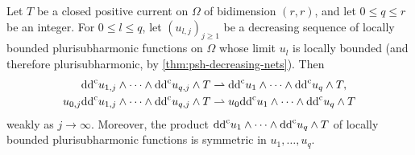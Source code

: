 \begin{theorem}\label{thm:bt-decreasing-continuity}
Let $T$ be a closed positive current on $\Omega$ of bidimension $(r,r)$, and let $0\le q\le r$ be an integer. For $0\le l\le q$, let $(u_{l,j})_{j\ge1}$ be a decreasing sequence of locally bounded plurisubharmonic functions on $\Omega$ whose limit $u_l$ is locally bounded (and therefore plurisubharmonic, by \cref{thm:psh-decreasing-nets}). Then
\[
 \begin{aligned}
 \mathrm{dd}^{\mathrm{c}} u_{1,j}\wedge\cdots\wedge\mathrm{dd}^{\mathrm{c}} u_{q,j}\wedge T
 &\rightharpoonup\mathrm{dd}^{\mathrm{c}} u_1\wedge\cdots\wedge\mathrm{dd}^{\mathrm{c}} u_q\wedge T,\\
 u_{0,j}\mathrm{dd}^{\mathrm{c}} u_{1,j}\wedge\cdots\wedge\mathrm{dd}^{\mathrm{c}} u_{q,j}\wedge T
 &\rightharpoonup u_0\mathrm{dd}^{\mathrm{c}} u_1\wedge\cdots\wedge\mathrm{dd}^{\mathrm{c}} u_q\wedge T
 \end{aligned}
\]
weakly as $j\to\infty$. Moreover, the product $\mathrm{dd}^{\mathrm{c}} u_1\wedge\cdots\wedge\mathrm{dd}^{\mathrm{c}} u_q\wedge T$ of locally bounded plurisubharmonic functions is symmetric in $u_1,\ldots,u_q$.
\end{theorem}

